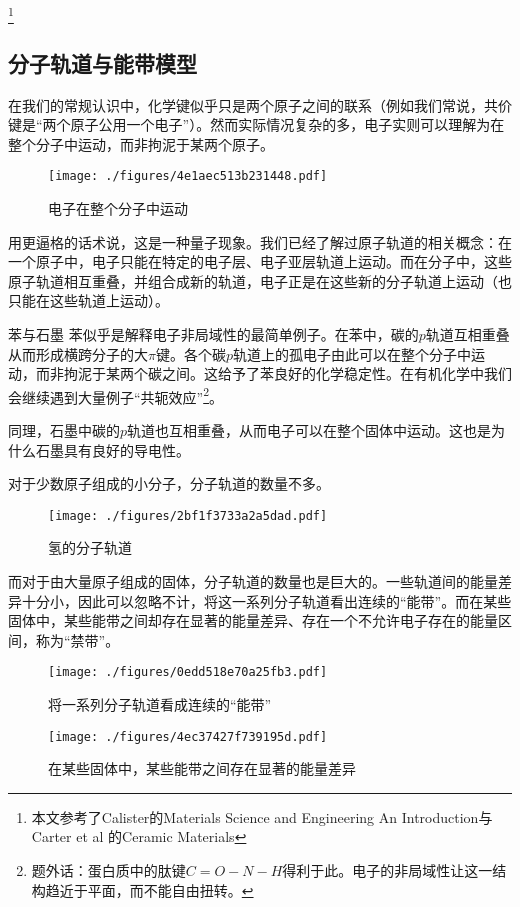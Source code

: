 
\begin{issues}
\issueDraft
\end{issues}


\footnote{本文参考了Calister的Materials Science and Engineering An Introduction与Carter et al 的Ceramic Materials}
\subsection{分子轨道与能带模型}
在我们的常规认识中，化学键似乎只是两个原子之间的联系（例如我们常说，共价键是“两个原子公用一个电子”）。然而实际情况复杂的多，电子实则可以理解为在整个分子中运动，而非拘泥于某两个原子。
\begin{figure}[ht]
\centering
\texttt{[image: ./figures/4e1aec513b231448.pdf]}
\caption{电子在整个分子中运动} \label{fig_BNDGP_1}
\end{figure}
用更逼格的话术说，这是一种量子现象。我们已经了解过原子轨道的相关概念：在一个原子中，电子只能在特定的电子层、电子亚层轨道上运动。而在分子中，这些原子轨道相互重叠，并组合成新的轨道，电子正是在这些新的分子轨道上运动（也只能在这些轨道上运动）。

\begin{example}{苯与石墨}
苯似乎是解释电子非局域性的最简单例子。在苯中，碳的$p$轨道互相重叠从而形成横跨分子的大$\pi$键。各个碳$p$轨道上的孤电子由此可以在整个分子中运动，而非拘泥于某两个碳之间。这给予了苯良好的化学稳定性。在有机化学中我们会继续遇到大量例子“共轭效应”\footnote{题外话：蛋白质中的肽键$C=O-N-H$得利于此。电子的非局域性让这一结构趋近于平面，而不能自由扭转。}。

同理，石墨中碳的$p$轨道也互相重叠，从而电子可以在整个固体中运动。这也是为什么石墨具有良好的导电性。
\end{example}

对于少数原子组成的小分子，分子轨道的数量不多。
\begin{figure}[ht]
\centering
\texttt{[image: ./figures/2bf1f3733a2a5dad.pdf]}
\caption{氢的分子轨道} \label{fig_BNDGP_2}
\end{figure}
而对于由大量原子组成的固体，分子轨道的数量也是巨大的。一些轨道间的能量差异十分小，因此可以忽略不计，将这一系列分子轨道看出连续的“能带”。而在某些固体中，某些能带之间却存在显著的能量差异、存在一个不允许电子存在的能量区间，称为“禁带”。
\begin{figure}[ht]
\centering
\texttt{[image: ./figures/0edd518e70a25fb3.pdf]}
\caption{将一系列分子轨道看成连续的“能带”} \label{fig_BNDGP_3}
\end{figure}
\begin{figure}[ht]
\centering
\texttt{[image: ./figures/4ec37427f739195d.pdf]}
\caption{在某些固体中，某些能带之间存在显著的能量差异} \label{fig_BNDGP_4}
\end{figure}

